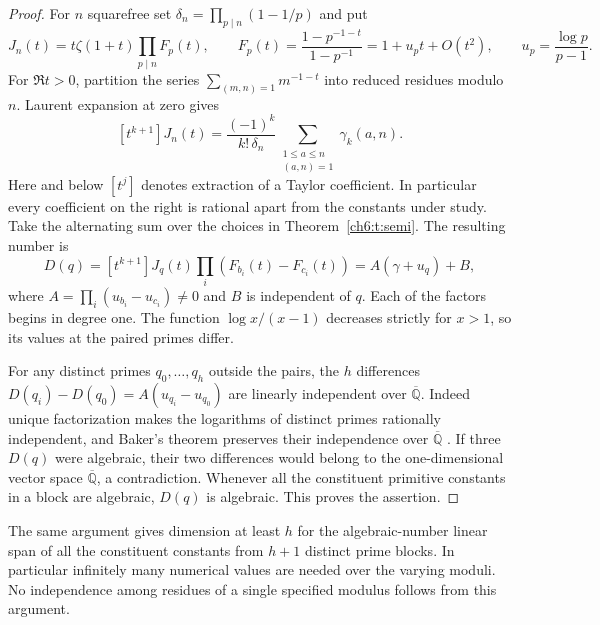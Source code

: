 \documentclass[11pt,a4paper,oneside,openany]{report}
\theoremstyle{remark}\newtheorem{remark}[theorem]{Remark}
\numberwithin{equation}{section}
\begin{document}
\begin{proof}
For $n$ squarefree set $\delta_n=\prod_{p\mid n}(1-1/p)$ and put
\[
 J_n(t)=t\zeta(1+t)\prod_{p\mid n}F_p(t),\qquad
 F_p(t)=\frac{1-p^{-1-t}}{1-p^{-1}}
       =1+u_pt+O(t^2),\qquad u_p=\frac{\log p}{p-1}.
\]
For $\Re t>0$, partition the series $\sum_{(m,n)=1}m^{-1-t}$ into reduced residues modulo $n$. Laurent expansion at zero gives
\[
 [t^{k+1}]J_n(t)=\frac{(-1)^k}{k!\,\delta_n}
                  \sum_{\substack{1\le a\le n\\ (a,n)=1}}\gamma_k(a,n).
\]
Here and below $[t^j]$ denotes extraction of a Taylor coefficient. In particular every coefficient on the right is rational apart from the constants under study. Take the alternating sum over the choices in Theorem~\ref{ch6:t:semi}. The resulting number is
\[
 D(q)=[t^{k+1}]J_q(t)\prod_i(F_{b_i}(t)-F_{c_i}(t))
     =A(\gamma+u_q)+B,
\]
where $A=\prod_i(u_{b_i}-u_{c_i})\ne0$ and $B$ is independent of $q$. Each of the factors begins in degree one. The function $\log x/(x-1)$ decreases strictly for $x>1$, so its values at the paired primes differ.

For any distinct primes $q_0,\ldots,q_h$ outside the pairs, the $h$ differences $D(q_i)-D(q_0)=A(u_{q_i}-u_{q_0})$ are linearly independent over $\overline{\mathbb Q}$. Indeed unique factorization makes the logarithms of distinct primes rationally independent, and Baker's theorem preserves their independence over $\overline{\mathbb Q}$ \cite{baker}. If three $D(q)$ were algebraic, their two differences would belong to the one-dimensional vector space $\overline{\mathbb Q}$, a contradiction. Whenever all the constituent primitive constants in a block are algebraic, $D(q)$ is algebraic. This proves the assertion.
\end{proof}
The same argument gives dimension at least $h$ for the algebraic-number linear span of all the constituent constants from $h+1$ distinct prime blocks. In particular infinitely many numerical values are needed over the varying moduli. No independence among residues of a single specified modulus follows from this argument.
\end{document}
